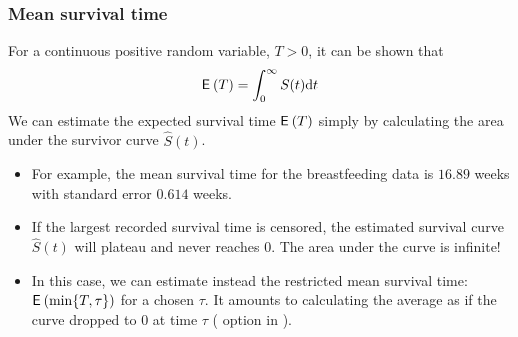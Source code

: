 \documentclass{beamer}
\begin{document}
\begin{frame}
\frametitle{Mean survival time}
For a continuous positive random variable, $T>0$, it can be shown that 
\begin{align*}
{\mathsf E}_{}\left(T\right) = \int_0^{\infty} S(t) \mathrm{d} t
\end{align*}
We can estimate the expected survival time ${\mathsf E}_{}\left(T\right)$ simply by calculating the area under the survivor curve $\widehat{S}(t)$. 
\begin{itemize}
\item For example, the mean survival time for the breastfeeding data is $16.89$ weeks with standard error $0.614$ weeks.
\item If the largest recorded survival time is \alert{censored}, the estimated survival curve $\widehat{S}(t)$ will plateau and never reaches  $0$. The area under the curve is infinite!
\item  In this case, we can estimate instead the restricted mean survival time: ${\mathsf E}_{}\left(\min\{T,\tau\}\right)$ for a chosen $\tau$. It amounts to calculating the average as if the curve dropped to $0$ at time $\tau$ ( option in \SASlang{}).
\end{itemize} 
\end{frame}
% 
%   
\end{document}
